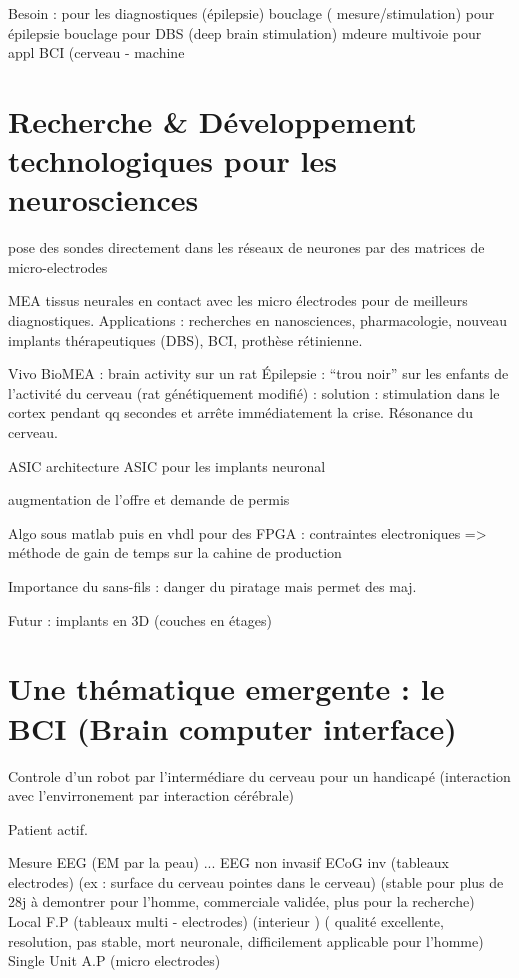 \documentclass[a4paper,12pt]{article}
\begin{document}
Besoin :
pour les diagnostiques (épilepsie)
bouclage ( mesure/stimulation) pour épilepsie
bouclage pour DBS (deep brain stimulation)
mdeure multivoie pour appl BCI (cerveau - machine

\section{Recherche \& Développement technologiques pour les neurosciences}



pose des sondes directement dans les réseaux de neurones par des matrices de micro-electrodes

MEA 
tissus neurales en contact avec les micro électrodes pour de meilleurs diagnostiques.
Applications : recherches en nanosciences, pharmacologie, nouveau implants thérapeutiques (DBS), BCI, prothèse rétinienne.


Vivo BioMEA : brain activity sur un rat
Épilepsie : ``trou noir'' sur les enfants de l'activité du cerveau (rat génétiquement modifié) : solution : stimulation dans le cortex pendant qq secondes et arrête immédiatement la crise. Résonance du cerveau.


ASIC
architecture ASIC  pour les implants neuronal

augmentation de l'offre et demande de permis


Algo sous matlab puis en vhdl pour des FPGA : contraintes electroniques  => méthode de gain de temps sur la cahine de production

Importance du sans-fils : danger du piratage mais permet des maj.

Futur : implants en 3D (couches en étages)

\section{Une thématique emergente : le BCI (Brain computer interface)}
Controle d'un robot par l'intermédiare du cerveau pour un handicapé (interaction avec l'envirronement par interaction cérébrale)

Patient actif.

Mesure EEG (EM par la peau) ...
EEG non invasif
ECoG inv (tableaux electrodes) (ex : surface du cerveau pointes dans le cerveau) (stable pour plus de 28j à demontrer pour l'homme, commerciale validée, plus pour la recherche)
Local F.P (tableaux multi - electrodes) (interieur ) ( qualité excellente, resolution,  pas stable, mort neuronale, difficilement applicable pour l'homme)
Single Unit A.P (micro electrodes)
\end{document}
